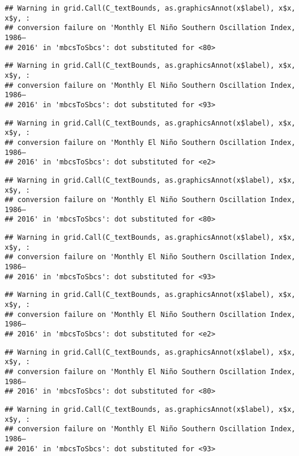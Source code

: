\documentclass[]{article}
\theoremstyle{definition}
\theoremstyle{definition}
\theoremstyle{definition}
\theoremstyle{remark}
\begin{document}
\begin{verbatim}
## Warning in grid.Call(C_textBounds, as.graphicsAnnot(x$label), x$x, x$y, :
## conversion failure on 'Monthly El Niño Southern Oscillation Index, 1986–
## 2016' in 'mbcsToSbcs': dot substituted for <80>
\end{verbatim}

\begin{verbatim}
## Warning in grid.Call(C_textBounds, as.graphicsAnnot(x$label), x$x, x$y, :
## conversion failure on 'Monthly El Niño Southern Oscillation Index, 1986–
## 2016' in 'mbcsToSbcs': dot substituted for <93>
\end{verbatim}

\begin{verbatim}
## Warning in grid.Call(C_textBounds, as.graphicsAnnot(x$label), x$x, x$y, :
## conversion failure on 'Monthly El Niño Southern Oscillation Index, 1986–
## 2016' in 'mbcsToSbcs': dot substituted for <e2>
\end{verbatim}

\begin{verbatim}
## Warning in grid.Call(C_textBounds, as.graphicsAnnot(x$label), x$x, x$y, :
## conversion failure on 'Monthly El Niño Southern Oscillation Index, 1986–
## 2016' in 'mbcsToSbcs': dot substituted for <80>
\end{verbatim}

\begin{verbatim}
## Warning in grid.Call(C_textBounds, as.graphicsAnnot(x$label), x$x, x$y, :
## conversion failure on 'Monthly El Niño Southern Oscillation Index, 1986–
## 2016' in 'mbcsToSbcs': dot substituted for <93>
\end{verbatim}

\begin{verbatim}
## Warning in grid.Call(C_textBounds, as.graphicsAnnot(x$label), x$x, x$y, :
## conversion failure on 'Monthly El Niño Southern Oscillation Index, 1986–
## 2016' in 'mbcsToSbcs': dot substituted for <e2>
\end{verbatim}

\begin{verbatim}
## Warning in grid.Call(C_textBounds, as.graphicsAnnot(x$label), x$x, x$y, :
## conversion failure on 'Monthly El Niño Southern Oscillation Index, 1986–
## 2016' in 'mbcsToSbcs': dot substituted for <80>
\end{verbatim}

\begin{verbatim}
## Warning in grid.Call(C_textBounds, as.graphicsAnnot(x$label), x$x, x$y, :
## conversion failure on 'Monthly El Niño Southern Oscillation Index, 1986–
## 2016' in 'mbcsToSbcs': dot substituted for <93>
\end{verbatim}
\end{document}
